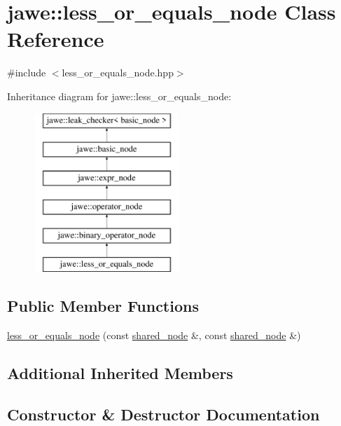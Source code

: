 \hypertarget{classjawe_1_1less__or__equals__node}{}\section{jawe\+:\+:less\+\_\+or\+\_\+equals\+\_\+node Class Reference}
\label{classjawe_1_1less__or__equals__node}


{\ttfamily \#include $<$less\+\_\+or\+\_\+equals\+\_\+node.\+hpp$>$}

Inheritance diagram for jawe\+:\+:less\+\_\+or\+\_\+equals\+\_\+node\+:\begin{figure}[H]
\begin{center}
\leavevmode
\includegraphics[height=6.000000cm]{classjawe_1_1less__or__equals__node}
\end{center}
\end{figure}
\subsection*{Public Member Functions}
\begin{DoxyCompactItemize}
\item 
\hyperlink{classjawe_1_1less__or__equals__node_a6db57909afa7fe02aa520536236bce33}{less\+\_\+or\+\_\+equals\+\_\+node} (const \hyperlink{namespacejawe_a3f307481d921b6cbb50cc8511fc2b544}{shared\+\_\+node} \&, const \hyperlink{namespacejawe_a3f307481d921b6cbb50cc8511fc2b544}{shared\+\_\+node} \&)
\end{DoxyCompactItemize}
\subsection*{Additional Inherited Members}


\subsection{Constructor \& Destructor Documentation}
\mbox{\label{classjawe_1_1less__or__equals__node_a6db57909afa7fe02aa520536236bce33}} 

